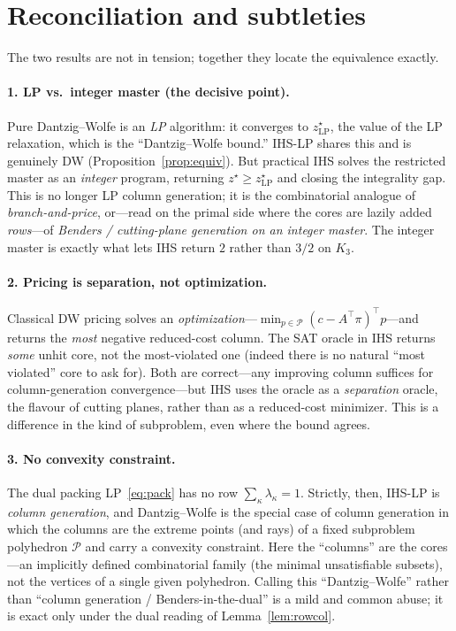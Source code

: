 \documentclass[11pt,a4paper]{article}
\begin{document}
\section{Reconciliation and subtleties}
\label{sec:subtle}

The two results are not in tension; together they locate the equivalence
exactly.

\paragraph{1. LP vs.\ integer master (the decisive point).}
Pure Dantzig--Wolfe is an \emph{LP} algorithm: it converges to
$z^\star_{\mathrm{LP}}$, the value of the LP relaxation, which is the
``Dantzig--Wolfe bound.'' IHS-LP shares this and is genuinely DW
(Proposition~\ref{prop:equiv}). But practical IHS solves the restricted master
as an \emph{integer} program, returning $z^\star \ge z^\star_{\mathrm{LP}}$ and
closing the integrality gap. This is no longer LP column generation; it is the
combinatorial analogue of \emph{branch-and-price}, or---read on the primal side
where the cores are lazily added \emph{rows}---of \emph{Benders / cutting-plane
generation on an integer master}. The integer master is exactly what lets IHS
return $2$ rather than $3/2$ on $K_3$.

\paragraph{2. Pricing is separation, not optimization.}
Classical DW pricing solves an \emph{optimization}---$\min_{p\in\mathcal{P}}
(c - A^\top\pi)^\top p$---and returns the \emph{most} negative reduced-cost
column. The SAT oracle in IHS returns \emph{some} unhit core, not the
most-violated one (indeed there is no natural ``most violated'' core to ask
for). Both are correct---any improving column suffices for column-generation
convergence---but IHS uses the oracle as a \emph{separation} oracle, the flavour
of cutting planes, rather than as a reduced-cost minimizer. This is a difference
in the kind of subproblem, even where the bound agrees.

\paragraph{3. No convexity constraint.}
The dual packing LP~\eqref{eq:pack} has no row $\sum_\kappa \lambda_\kappa = 1$.
Strictly, then, IHS-LP is \emph{column generation}, and Dantzig--Wolfe is the
special case of column generation in which the columns are the extreme points
(and rays) of a fixed subproblem polyhedron $\mathcal{P}$ and carry a convexity
constraint. Here the ``columns'' are the cores---an implicitly defined
combinatorial family (the minimal unsatisfiable subsets), not the vertices of a
single given polyhedron. Calling this ``Dantzig--Wolfe'' rather than ``column
generation / Benders-in-the-dual'' is a mild and common abuse; it is exact only
under the dual reading of Lemma~\ref{lem:rowcol}.
\end{document}
